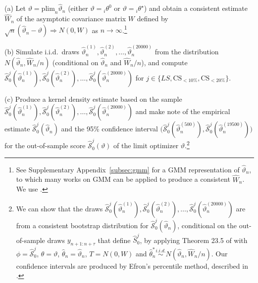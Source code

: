 \documentclass[12pt]{article}
\theoremstyle{definition}
\theoremstyle{remark}
\renewcommand{\appendixname}{Supplementary Appendix}
\begin{document}
\smallskip

\noindent (a) Let $\vartheta = \mathrm{plim}_n \hat{\vartheta}_n$ (either $\vartheta = {}_i \theta^0$ or $\vartheta = {}_i \theta^{\star}$) and obtain a consistent estimate $\hat{W}_n$ of the asymptotic covariance matrix $W$ defined by $\sqrt{n} (\hat{\vartheta}_n - \vartheta) \Rightarrow N(0, W)$ as $n \to \infty$.\footnote{See \appendixname\ \ref{subsec:gmm} for a GMM representation of $\hat{\vartheta}_n$, to which many works on GMM can be applied to produce a consistent $\hat{W}_n$. We use \cite{Andrews2002}.}

\smallskip

\noindent (b) Simulate i.i.d.\ draws $\hat{\vartheta}_n^{(1)}, \hat{\vartheta}_n^{(2)}, \ldots, \hat{\vartheta}_n^{(20000)}$ from the distribution $N(\hat{\vartheta}_n, \hat{W}_n/n)$ (conditional on $\hat{\vartheta}_n$ and $\hat{W}_n/n$), and compute $\hat{\mathcal{S}}^j_0(\hat{\vartheta}_n^{(1)}), \hat{\mathcal{S}}^j_0(\hat{\vartheta}_n^{(2)}), \ldots, \hat{\mathcal{S}}^j_0(\hat{\vartheta}_n^{(20000)})$ for $j \in \{LS,\allowbreak \mathrm{CS}_{<10\%},\allowbreak \mathrm{CS}_{<20\%}\}$.

\smallskip

\noindent (c) Produce a kernel density estimate based on the sample $\hat{\mathcal{S}}_{0}^{j}(\hat{\vartheta}_{n}^{(1)}), \hat{\mathcal{S}}_{0}^{j}(\hat{\vartheta}_{n}^{(2)}), \ldots, \hat{\mathcal{S}}_{0}^{j}(\hat{\vartheta}_{n}^{(20000)})$ and make note of the empirical estimate $\hat{\mathcal{S}}_{0}^{j}(\hat{\vartheta}_{n})$ and the 95\% confidence interval $\Big(\hat{\mathcal{S}}_{0}^{j}(\hat{\vartheta}_{n}^{(500)}), \allowbreak\hat{\mathcal{S}}_{0}^{j}(\hat{\vartheta}_{n}^{(19500)})\Big)$ for the out-of-sample score $\hat{\mathcal{S}}_{0}^{j}(\vartheta )$ of the limit optimizer $\vartheta$.\footnote{We can show that the draws $\hat{\mathcal{S}}_{0}^{j}(\hat{\vartheta}_{n}^{(1)}),\hat{\mathcal{S}}_{0}^{j}(\hat{\vartheta}_{n}^{(2)}), \ldots, \hat{\mathcal{S}}_{0}^{j}(\hat{\vartheta}_{n}^{(20000)})$ are from a consistent bootstrap distribution for $\hat{\mathcal{S}}_{0}^{j}(\hat{\vartheta}_{n})$, conditional on the out-of-sample draws $y_{n+1:n+\tau}$ that define $\hat{S}_{0}^{j}$, by applying Theorem 23.5 of \cite{VanDerVaart1998} with $\phi = \hat{\mathcal{S}}_{0}^{j}$, $\theta = \vartheta$, $\hat{\theta}_{n} = \hat{\vartheta}_{n}$, $T = N(0,W)$ and $\hat{\theta}_{n}^{\ast} \overset{i.i.d.}{\sim} N(\hat{\vartheta}_{n}, \hat{W}_{n}/n)$. Our confidence intervals are produced by Efron's percentile method, described in \citet[sec. 23.1]{VanDerVaart1998}.}
\end{document}
